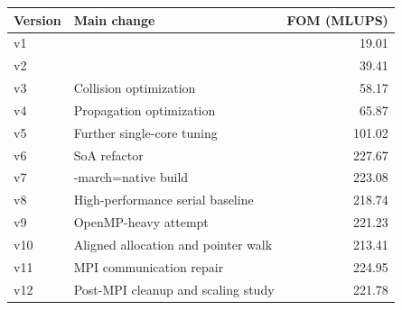 \begin{tabularx}{\textwidth}{@{}llr@{}}
\toprule
Version & Main change & FOM (MLUPS) \\
\midrule
v1 &  & 19.01 \\
v2 &  & 39.41 \\
v3 & Collision optimization & 58.17 \\
v4 & Propagation optimization & 65.87 \\
v5 & Further single-core tuning & 101.02 \\
v6 & SoA refactor & 227.67 \\
v7 & -march=native build & 223.08 \\
v8 & High-performance serial baseline & 218.74 \\
v9 & OpenMP-heavy attempt & 221.23 \\
v10 & Aligned allocation and pointer walk & 213.41 \\
v11 & MPI communication repair & 224.95 \\
v12 & Post-MPI cleanup and scaling study & 221.78 \\
\bottomrule
\end{tabularx}
